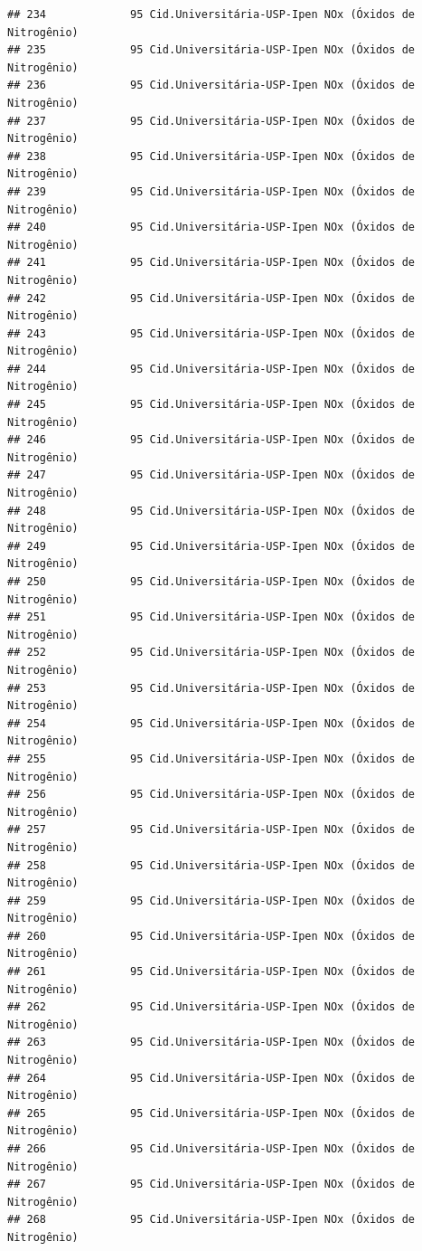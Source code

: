 \documentclass[]{book}
\begin{document}
\begin{verbatim}
## 234             95 Cid.Universitária-USP-Ipen NOx (Óxidos de Nitrogênio)
## 235             95 Cid.Universitária-USP-Ipen NOx (Óxidos de Nitrogênio)
## 236             95 Cid.Universitária-USP-Ipen NOx (Óxidos de Nitrogênio)
## 237             95 Cid.Universitária-USP-Ipen NOx (Óxidos de Nitrogênio)
## 238             95 Cid.Universitária-USP-Ipen NOx (Óxidos de Nitrogênio)
## 239             95 Cid.Universitária-USP-Ipen NOx (Óxidos de Nitrogênio)
## 240             95 Cid.Universitária-USP-Ipen NOx (Óxidos de Nitrogênio)
## 241             95 Cid.Universitária-USP-Ipen NOx (Óxidos de Nitrogênio)
## 242             95 Cid.Universitária-USP-Ipen NOx (Óxidos de Nitrogênio)
## 243             95 Cid.Universitária-USP-Ipen NOx (Óxidos de Nitrogênio)
## 244             95 Cid.Universitária-USP-Ipen NOx (Óxidos de Nitrogênio)
## 245             95 Cid.Universitária-USP-Ipen NOx (Óxidos de Nitrogênio)
## 246             95 Cid.Universitária-USP-Ipen NOx (Óxidos de Nitrogênio)
## 247             95 Cid.Universitária-USP-Ipen NOx (Óxidos de Nitrogênio)
## 248             95 Cid.Universitária-USP-Ipen NOx (Óxidos de Nitrogênio)
## 249             95 Cid.Universitária-USP-Ipen NOx (Óxidos de Nitrogênio)
## 250             95 Cid.Universitária-USP-Ipen NOx (Óxidos de Nitrogênio)
## 251             95 Cid.Universitária-USP-Ipen NOx (Óxidos de Nitrogênio)
## 252             95 Cid.Universitária-USP-Ipen NOx (Óxidos de Nitrogênio)
## 253             95 Cid.Universitária-USP-Ipen NOx (Óxidos de Nitrogênio)
## 254             95 Cid.Universitária-USP-Ipen NOx (Óxidos de Nitrogênio)
## 255             95 Cid.Universitária-USP-Ipen NOx (Óxidos de Nitrogênio)
## 256             95 Cid.Universitária-USP-Ipen NOx (Óxidos de Nitrogênio)
## 257             95 Cid.Universitária-USP-Ipen NOx (Óxidos de Nitrogênio)
## 258             95 Cid.Universitária-USP-Ipen NOx (Óxidos de Nitrogênio)
## 259             95 Cid.Universitária-USP-Ipen NOx (Óxidos de Nitrogênio)
## 260             95 Cid.Universitária-USP-Ipen NOx (Óxidos de Nitrogênio)
## 261             95 Cid.Universitária-USP-Ipen NOx (Óxidos de Nitrogênio)
## 262             95 Cid.Universitária-USP-Ipen NOx (Óxidos de Nitrogênio)
## 263             95 Cid.Universitária-USP-Ipen NOx (Óxidos de Nitrogênio)
## 264             95 Cid.Universitária-USP-Ipen NOx (Óxidos de Nitrogênio)
## 265             95 Cid.Universitária-USP-Ipen NOx (Óxidos de Nitrogênio)
## 266             95 Cid.Universitária-USP-Ipen NOx (Óxidos de Nitrogênio)
## 267             95 Cid.Universitária-USP-Ipen NOx (Óxidos de Nitrogênio)
## 268             95 Cid.Universitária-USP-Ipen NOx (Óxidos de Nitrogênio)

\end{verbatim}
\end{document}
